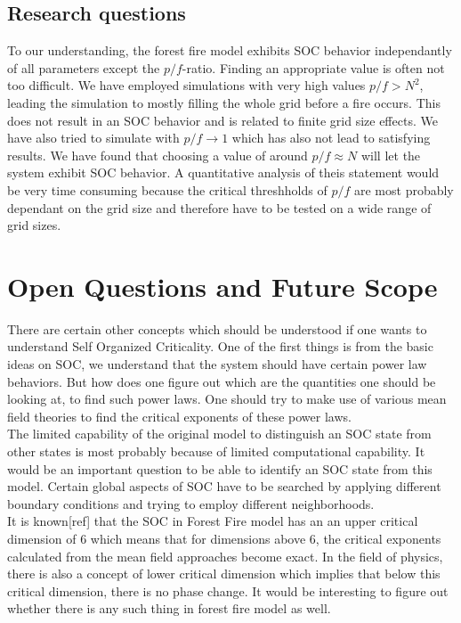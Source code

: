 \documentclass[11pt]{article}
\begin{document}
\subsection{Research questions}

To our understanding, the forest fire model exhibits SOC behavior independantly of all parameters except the $p/f$-ratio. Finding an appropriate value is often not too difficult. We have employed simulations with very high values $p/f>N^{2}$, leading the simulation to mostly filling the whole grid before a fire occurs. This does not result in an SOC behavior and is related to finite grid size effects. We have also tried to simulate with $p/f \rightarrow 1$ which has also not lead to satisfying results. We have found that choosing a value of around $p/f \approx N$ will let the system exhibit SOC behavior. A quantitative analysis of theis statement would be very time consuming because the critical threshholds of $p/f$ are most probably dependant on the grid size and therefore have to be tested on a wide range of grid sizes.



\section{Open Questions and Future Scope}
There are certain other concepts which should be understood if one wants to understand Self Organized Criticality. One of the first things is from the basic ideas on SOC, we understand that the system should have certain power law behaviors. But how does one figure out which are the quantities one should be looking at, to find such power laws. One should try to make use of various  mean field theories to find the critical exponents of these power laws.\\
The limited capability of the original model to distinguish an SOC state from other states is most probably because of limited computational capability. It would be an important question to be able to identify an SOC state from this model.
Certain global aspects of SOC have to be searched by applying different boundary conditions and trying to employ different neighborhoods. \\
It is known[ref] that the SOC in Forest Fire model has an an upper critical dimension of 6 which means that for dimensions above 6, the critical exponents calculated from the mean field approaches become exact. In the field of physics, there is also a concept of lower critical dimension which implies that below this critical dimension, there is no phase change. It would be interesting to figure out whether there is any such thing in forest fire model as well.
 
\end{document}
